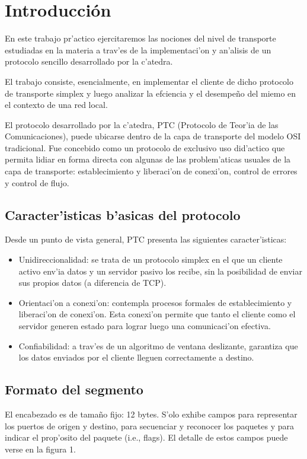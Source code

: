 \section{Introducción}

En este trabajo pr'actico ejercitaremos las nociones del nivel de transporte estudiadas en la materia a trav'es de la implementaci'on y an'alisis de un protocolo sencillo desarrollado por la c'atedra.

El trabajo consiste, esencialmente, en implementar el cliente de dicho protocolo de transporte simplex y luego analizar la efciencia y el desempeño del miemo en el contexto de una red local. 

El protocolo desarrollado por la c'atedra, PTC (Protocolo de Teor'ia de las Comunicaciones), puede ubicarse dentro de la capa de transporte del modelo OSI tradicional. Fue concebido como un protocolo de exclusivo uso did'actico que permita lidiar en forma directa con algunas de las problem'aticas usuales de la capa de transporte: establecimiento y liberaci'on de conexi'on, control de errores y control de flujo.

\subsection{Caracter'isticas b'asicas del protocolo}
Desde un punto de vista general, PTC presenta las siguientes caracter'isticas:

\begin{itemize}
	\item Unidireccionalidad: se trata de un protocolo simplex en el que un cliente activo env'ia datos y un servidor pasivo los recibe, sin la posibilidad de enviar sus propios datos (a diferencia de TCP).
  \item Orientaci'on a conexi'on: contempla procesos formales de establecimiento y liberaci'on de conexi'on. Esta conexi'on permite que tanto el cliente como el servidor generen estado para lograr luego una comunicaci'on efectiva.
	\item Confiabilidad: a trav'es de un algoritmo de ventana deslizante, garantiza que los datos enviados por el cliente lleguen correctamente a destino.
\end{itemize}

\subsection{Formato del segmento}

El encabezado es de tamaño fijo: 12 bytes. S'olo exhibe campos para representar los puertos de origen y destino, para secuenciar y reconocer los paquetes y para indicar el prop'osito del paquete (i.e., flags). El detalle de estos campos puede verse en la figura 1.

